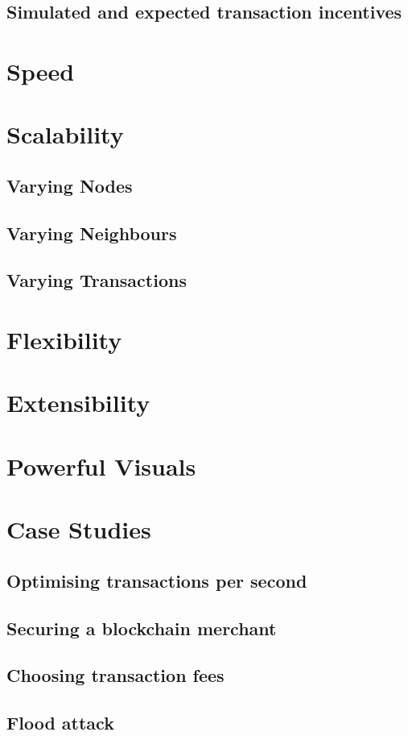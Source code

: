 \subsection{Simulated and expected transaction incentives}

\section{Speed}
\section{Scalability}
\subsection{Varying Nodes}
\subsection{Varying Neighbours}
\subsection{Varying Transactions}
\section{Flexibility}
\section{Extensibility}
\section{Powerful Visuals}
\section{Case Studies}
\subsection{Optimising transactions per second}
\subsection{Securing a blockchain merchant}
\subsection{Choosing transaction fees}
\subsection{Flood attack}